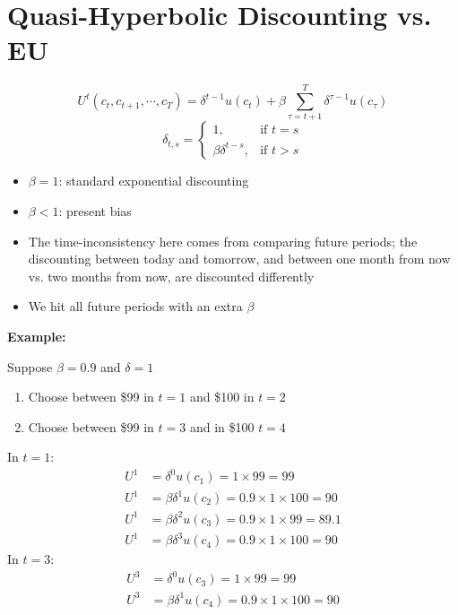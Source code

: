 \documentclass[a4paper]{article}
\begin{document}
\section{Quasi-Hyperbolic Discounting vs. EU}
\begin{equation*}
    U^t(c_t,c_{t+1},\cdots,c_T)=\delta^{t-1}u(c_t)+\beta\sum_{\tau=t+1}^{T}\delta^{\tau-1}u(c_{\tau})
\end{equation*}
\begin{equation*}
    \delta_{t,s}=
    \begin{cases}
    1, & \textrm{if } t=s \\
    \beta\delta^{t-s}, & \textrm{if } t>s
    \end{cases}
\end{equation*}
\begin{itemize}
    \item $\beta=1$: standard exponential discounting
    \item $\beta<1$: present bias
    \item The time-inconsistency here comes from comparing future periods; the discounting between today and tomorrow, and between one month from now vs. two months from now, are discounted differently
    \item We hit all future periods with an extra $\beta$
\end{itemize}
\textbf{Example:}

Suppose $\beta=0.9$ and $\delta=1$
\begin{enumerate}
    \item Choose between \$99 in $t=1$ and \$100 in $t=2$
    \item Choose between \$99 in $t=3$ and in \$100 $t=4$
\end{enumerate}
In $t=1$:
\begin{align*}
    U^1&=\delta^{0}u(c_1)=1\times 99=99 \\
    U^1&=\beta\delta^{1}u(c_2)=0.9\times 1\times 100=90 \\
    U^1&=\beta\delta^{2}u(c_3)=0.9\times 1\times 99=89.1 \\
    U^1&=\beta\delta^{3}u(c_4)=0.9\times 1\times 100=90
\end{align*}
In $t=3$:
\begin{align*}
    U^3&=\delta^{0}u(c_3)=1\times 99=99 \\
    U^3&=\beta\delta^{1}u(c_4)=0.9\times 1\times 100=90
\end{align*}
\end{document}
